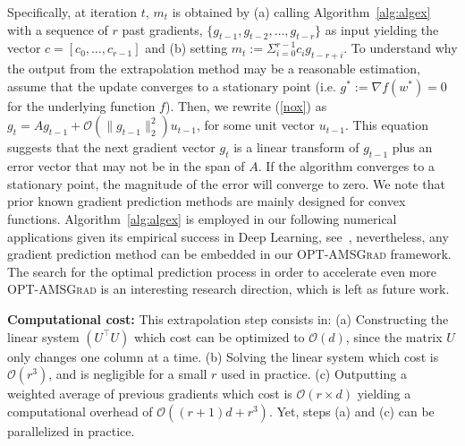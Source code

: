 \documentclass[wcp]{jmlr}
\begin{document}
Specifically, at iteration $t$, $m_t$ is obtained by \textsf{(a)} calling Algorithm~\ref{alg:algex} with a sequence of $r$ past gradients, $\{ g_{t-1},g_{t-2}, \dots, g_{t-r} \}$ as input yielding the vector $c = [c_0, \dots, c_{r-1}] $ and \textsf{(b)} setting $m_t:= \Sigma_{i=0}^{r-1} c_i g_{t-r+i}$.
To understand why the output from the extrapolation method may be a reasonable estimation, assume that the update converges to a stationary point (i.e. $g^*:=\nabla f(w^*) = 0$ for the underlying function $f$). Then, we rewrite (\ref{nox}) as $g_t = A g_{t-1}  + \mathcal{O}( \| g_{t-1} \|_2^2 ) u_{t-1}$, for some unit vector $u_{t-1}$.
This equation suggests that the next gradient vector $g_{t}$ is a linear transform of $g_{{t-1}}$ plus an error vector that may not be in the span of $A$.
If the algorithm converges to a stationary point, the magnitude of the error will converge to zero. 
We note that prior known gradient prediction methods are mainly designed for convex functions.
Algorithm~\ref{alg:algex} is employed in our following numerical applications given its empirical success in Deep Learning, see~\cite{Scieur18}, nevertheless, any gradient prediction method can be embedded in our \textsc{OPT-AMSGrad} framework.
The search for the optimal prediction process in order to accelerate even more \textsc{OPT-AMSGrad} is an interesting research direction, which is left as future work.

\textbf{Computational cost:}
 This extrapolation step consists in: \textsf{(a)} Constructing the linear system $(U^\top U)$ which cost can be optimized to $\mathcal{O}(d)$, since the matrix $U$ only changes one column at a time. \textsf{(b)} Solving the linear system which cost is $\mathcal{O}(r^3)$, and is negligible for a small $r$ used in practice.\textsf{ (c)} Outputting a weighted average of previous gradients which cost is $\mathcal{O}(r \times d)$ yielding a computational overhead of $\mathcal O\left((r+1)d+r^3\right)$.
Yet, steps \textsf{(a)} and \textsf{(c)} can be parallelized in practice.
\end{document}
